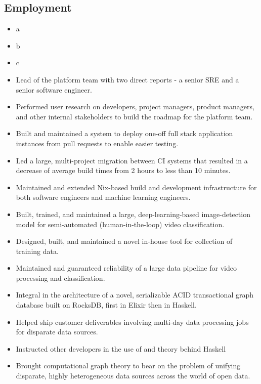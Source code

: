 \documentclass[10pt,a4paper,sans]{moderncv}        %
\begin{document}
\subsection{Employment}
{\begin{itemize}
   \item a
   \item b
   \item c
 \end{itemize}}
{\begin{itemize}
   \item Lead of the platform team with two direct reports - a senior SRE and
     a senior software engineer.
   \item Performed user research on developers, project managers, product
     managers, and other internal stakeholders to build the roadmap for the
     platform team.
   \item Built and maintained a system to deploy one-off full stack
     application instances from pull requests to enable easier testing.
   \item Led a large, multi-project migration between CI systems that resulted
     in a decrease of average build times from 2 hours to less than 10 minutes.
   \item Maintained and extended Nix-based build and development
     infrastructure for both software engineers and machine learning engineers.
 \end{itemize}}
{\begin{itemize}
   \item Built, trained, and maintained a large, deep-learning-based
     image-detection model for semi-automated (human-in-the-loop) video
     classification.
   \item Designed, built, and maintained a novel in-house tool for collection of
     training data.
   \item Maintained and guaranteed reliability of a large data pipeline for
     video processing and classification.
 \end{itemize}}
{\begin{itemize}
   \item Integral in the architecture of a novel, serializable ACID
     transactional graph database built on RocksDB, first in Elixir then in
     Haskell.
   \item Helped ship customer deliverables involving multi-day data
     processing jobs for disparate data sources.
   \item Instructed other developers in the use of and theory behind Haskell
   \item Brought computational graph theory to bear on the problem of unifying
     disparate, highly heterogeneous data sources across the world of open data.
 \end{itemize}}
\end{document}
